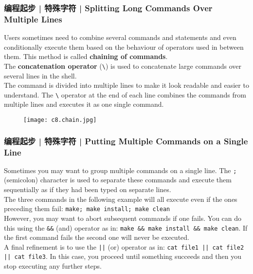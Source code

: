 \begin{frame}[fragile]
  \frametitle{编程起步 | 特殊字符 | Splitting Long Commands Over Multiple Lines}
  Users sometimes need to combine several commands and statements and even conditionally execute them based on the behaviour of operators used in between them. This method is called \textbf{chaining of commands}.\\
  \vspace{0.2cm}
  The \textbf{concatenation operator} (\verb|\|) is used to concatenate large commands over several lines in the shell.\\
  \vspace{0.2cm}
  The command is divided into multiple lines to make it look readable and easier to understand. The \verb|\| operator at the end of each line combines the commands from multiple lines and executes it as one single command.
  \begin{figure}
    \centering
    \texttt{[image: c8.chain.jpg]}
  \end{figure}
\end{frame}

\begin{frame}[fragile]
  \frametitle{编程起步 | 特殊字符 | Putting Multiple Commands on a Single Line}
  Sometimes you may want to group multiple commands on a single line. The \verb|;| (semicolon) character is used to separate these commands and execute them sequentially as if they had been typed on separate lines.\\
  \vspace{0.2cm}
  The three commands in the following example will all execute even if the ones preceding them fail: \verb|make; make install; make clean|\\
  \vspace{0.2cm}
  However, you may want to abort subsequent commands if one fails. You can do this using the \verb|&&| (and) operator as in: \verb|make && make install && make clean|. If the first command fails the second one will never be executed.\\
  \vspace{0.2cm}
  A final refinement is to use the \verb=||= (or) operator as in: \verb=cat file1 || cat file2 || cat file3=. In this case, you proceed until something succeeds and then you stop executing any further steps.
\end{frame}

